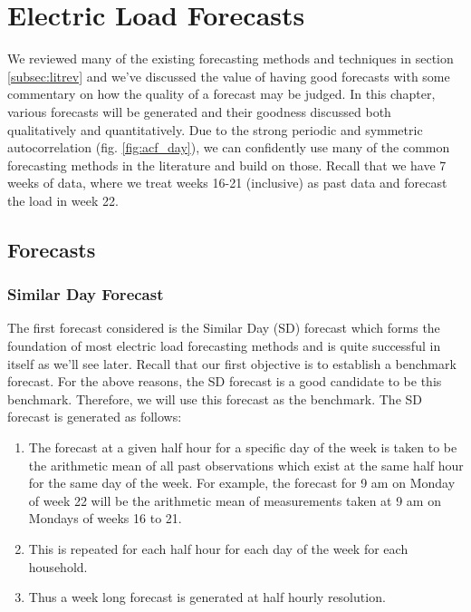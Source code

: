 
\chapter{Electric Load Forecasts}
We reviewed many of the existing forecasting methods and techniques in section \ref{subsec:litrev} and we've discussed the value of having good forecasts with some commentary on how the quality of a forecast may be judged. In this chapter, various forecasts will be generated and their goodness discussed both qualitatively and quantitatively. Due to the strong periodic and symmetric autocorrelation (fig. \ref{fig:acf_day}), we can confidently use many of the common forecasting methods in the literature and build on those. Recall that we have 7 weeks of data, where we treat weeks 16-21 (inclusive) as past data and forecast the load in week 22.

\section{Forecasts} \label{subsec:forecasts}

\subsection{Similar Day Forecast}

The first forecast considered is the Similar Day (SD) forecast which forms the foundation of most electric load forecasting methods and is quite successful in itself as we'll see later. Recall that our first objective is to establish a benchmark forecast. For the above reasons, the SD forecast is a good candidate to be this benchmark. Therefore, we will use this forecast as the benchmark. The SD forecast is generated as follows:
\begin{enumerate}
\item The forecast at a given half hour for a specific day of the week is taken to be the arithmetic mean of all past observations which exist at the same half hour for the same day of the week. For example, the forecast for 9 am on Monday of week 22 will be the arithmetic mean of measurements taken at 9 am on Mondays of weeks 16 to 21.
\item This is repeated for each half hour for each day of the week for each household.
\item Thus a week long forecast is generated at half hourly resolution.
\end{enumerate}

